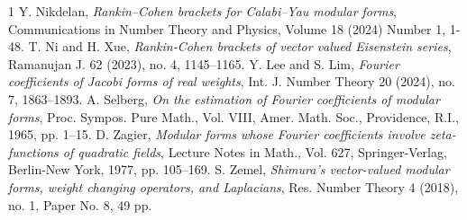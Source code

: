 \documentclass[11pt]{amsart}
\theoremstyle{definition}
\theoremstyle{remark}
\numberwithin{equation}{section}
\renewcommand{\(}{\left(}
\renewcommand{\)}{\right)}
\begin{document}
\begin{thebibliography}{1}
 Y. Nikdelan, \textit{Rankin–Cohen brackets for Calabi–Yau modular forms}, Communications in Number Theory and Physics, Volume 18 (2024) Number 1, 1-48. 
 T. Ni and H. Xue, \textit{Rankin-Cohen brackets of vector valued Eisenstein series}, Ramanujan J. 62 (2023), no. 4, 1145–1165.  
 Y. Lee and S. Lim, \textit{Fourier coefficients of Jacobi forms of real weights}, Int. J. Number Theory 20 (2024), no. 7, 1863–1893.
 A. Selberg, {\it On the estimation of Fourier coefficients of modular forms}, Proc. Sympos. Pure Math., Vol. VIII, Amer. Math. Soc., Providence, R.I., 1965, pp. 1–15.
 D. Zagier, \textit{Modular forms whose Fourier coefficients involve zeta-functions of quadratic fields}, Lecture Notes in Math., Vol. 627, Springer-Verlag, Berlin-New York, 1977, pp. 105–169.
 S. Zemel, \textit{Shimura's vector-valued modular forms, weight changing operators, and Laplacians}, Res. Number Theory 4 (2018), no. 1, Paper No. 8, 49 pp.
\end{thebibliography}
\end{document}
